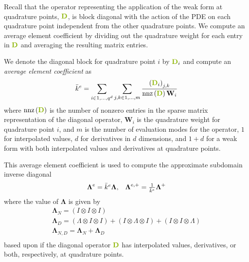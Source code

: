 Recall that the operator representing the application of the weak form at quadrature points, ${\color{applegreen}\mathbf{D}}$, is block diagonal with the action of the PDE on each quadrature point independent from the other quadrature points.
We compute an average element coefficient by dividing out the quadrature weight for each entry in ${\color{applegreen}\mathbf{D}}$ and averaging the resulting matrix entries.

\begin{definition}\label{def:averageelementcoefficient}
We denote the diagonal block for quadrature point $i$ by ${\color{applegreen}\mathbf{D}}_i$ and compute an \textit{average element coefficient} as
\begin{equation}
\bar{k}^e = \sum_{i \in 1, ..., q^d} \sum_{j, k \in 1, ..., m} \frac{\left( {\color{applegreen}\mathbf{D}}_{i} \right)_{j, k}}{\text{nnz} \left( {\color{applegreen}\mathbf{D}} \right) \mathbf{W}_i}
\end{equation}
where $\text{nnz} \left( {\color{applegreen}\mathbf{D}} \right)$ is the number of nonzero entries in the sparse matrix representation of the diagonal operator, $\mathbf{W}_i$ is the quadrature weight for quadrature point $i$, and $m$ is the number of evaluation modes for the operator, $1$ for interpolated values, $d$ for derivatives in $d$ dimensions, and $1 + d$ for a weak form with both interpolated values and derivatives at quadrature points.
\end{definition}

This average element coefficient is used to compute the approximate subdomain inverse diagonal
\begin{equation}
\begin{array}{c c}
\boldsymbol{\Lambda}^e = \bar{k}^e \boldsymbol{\Lambda},  &  \boldsymbol{\Lambda}^{e, +} = \frac{1}{\bar{k}^e} \boldsymbol{\Lambda}^{+}
\end{array}
\end{equation}
where the value of $\mathbf{\Lambda}$ is given by
\begin{equation}
\begin{array}{c}
\boldsymbol{\Lambda}_N      = \left( I \otimes I \otimes I \right)  \\
\boldsymbol{\Lambda}_D      = \left( \Lambda \otimes I \otimes I\right) + \left( I \otimes \Lambda \otimes I\right) + \left( I \otimes I \otimes \Lambda \right)  \\
\boldsymbol{\Lambda}_{N, D} = \boldsymbol{\Lambda}_N + \boldsymbol{\Lambda}_D  \\
\end{array}
\end{equation}
based upon if the diagonal operator ${\color{applegreen}\mathbf{D}}$ has interpolated values, derivatives, or both, respectively, at quadrature points.

